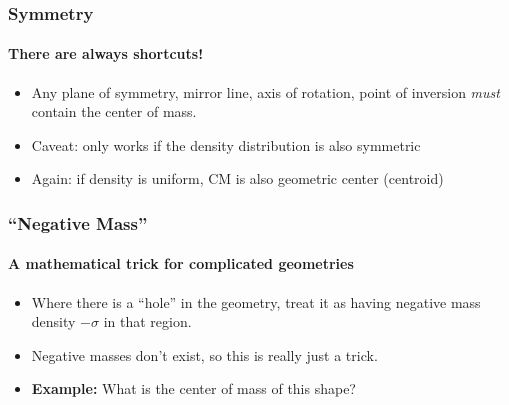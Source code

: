 \documentclass[12pt,compress,aspectratio=169]{beamer}
\begin{document}
\begin{frame}
  \frametitle{Symmetry}
  \framesubtitle{There are always shortcuts!}
  \begin{itemize}
  \item Any plane of symmetry, mirror line, axis of rotation, point of inversion
    \emph{must} contain the center of mass.
  \item Caveat: only works if the density distribution is also symmetric
  \item Again: if density is uniform, CM is also geometric center (centroid)
  \end{itemize}
\end{frame}


\begin{frame}
  \frametitle{``Negative Mass''}
  \framesubtitle{A mathematical trick for complicated geometries}
  \begin{itemize}
  \item Where there is a ``hole'' in the geometry, treat it as having negative
    mass density $-\sigma$ in that region.
  \item Negative masses don't exist, so this is really just a trick.
  \item\textbf{Example:} What is the center of mass of this shape?
    
    \begin{center}
    \end{center}
  \end{itemize}
\end{frame}
\end{document}
